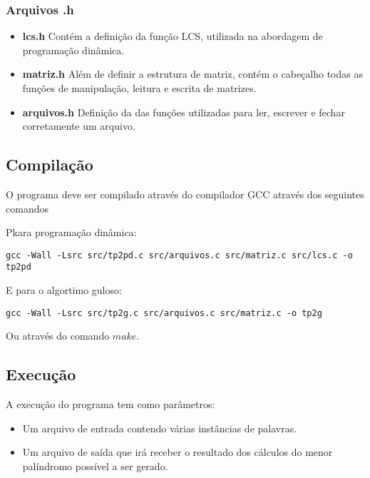 \documentclass[12pt]{article}
\begin{document}
\subsubsection{Arquivos .h}

\begin{itemize}
\item \textbf{lcs.h} Contém a definição da função LCS, utilizada na abordagem de programação dinâmica.
\item \textbf{matriz.h} Além de definir a estrutura de matriz, contém o cabeçalho todas as funções de manipulação, leitura e escrita de matrizes.
\item \textbf{arquivos.h} Definição da das funções utilizadas para ler, escrever e fechar corretamente um arquivo.
\end{itemize}

\subsection{Compilação}

O programa deve ser compilado através do compilador GCC através dos seguintes comandos

Pkara programação dinâmica:
\begin{footnotesize}
\begin{verbatim}
gcc -Wall -Lsrc src/tp2pd.c src/arquivos.c src/matriz.c src/lcs.c -o tp2pd \end{verbatim}
\end{footnotesize}

E para o algortimo guloso:
\begin{footnotesize}
\begin{verbatim}
gcc -Wall -Lsrc src/tp2g.c src/arquivos.c src/matriz.c -o tp2g \end{verbatim}
\end{footnotesize}

Ou através do comando $make$.

\subsection{Execução}

A execução do programa tem como parâmetros:
\begin{itemize}
\item Um arquivo de entrada contendo várias instâncias de palavras.
\item Um arquivo de saída que irá receber o resultado dos cálculos do menor palíndromo possível a ser gerado.
\end{itemize}
\end{document}
